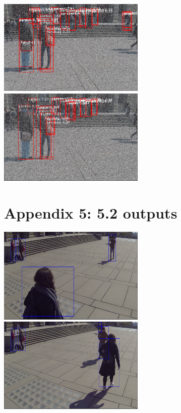 \documentclass[12pt]{report}
\begin{document}
\includegraphics[width=70mm]{./images/appendix/NoConfidenceAug40.PNG}
\includegraphics[width=70mm]{./images/appendix/NoConfidenceAug50.PNG}

\pagebreak
\section*{Appendix 5: 5.2 outputs}

\includegraphics[width=70mm]{./images/appendix/Video3output1.PNG}
\includegraphics[width=70mm]{./images/appendix/Video3output2.PNG}
\end{document}
